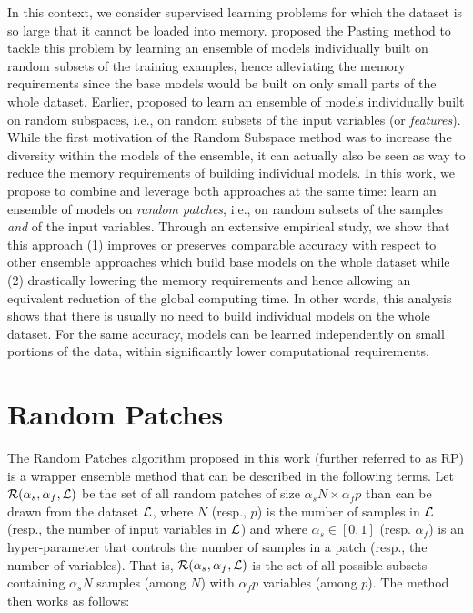 In this context, we consider supervised learning problems for which the dataset
is so large that it cannot be loaded into memory. \citet{breiman:1999} proposed
the Pasting method to tackle this problem by learning an ensemble of models
individually built on random subsets of the training examples, hence
alleviating the memory requirements since the base models would be built on
only small parts of the whole dataset. Earlier, \citet{ho:1998} proposed to
learn an ensemble of models individually built on random subspaces, i.e., on
random subsets of the input variables (or \textit{features}). While the first motivation of the Random
Subspace method was to increase the diversity within the models of the
ensemble, it can actually also be seen as way to reduce the memory requirements
of building individual models. In this work, we propose to combine and leverage
both approaches at the same time: learn an ensemble of models on \textit{random
patches}, i.e., on random subsets of the samples \textit{and} of the input
variables. Through an extensive empirical study, we show that this approach (1)
improves or preserves comparable accuracy with respect to other ensemble
approaches which build base models on the whole dataset while (2) drastically
lowering the memory requirements and hence allowing an equivalent reduction of
the global computing time. In other words, this analysis shows that there is
usually no need to build individual models on the whole dataset. For the same
accuracy, models can be learned independently on small portions of the data,
within significantly lower computational requirements.

\section{Random Patches}
\label{sec:9:rp}

The Random Patches algorithm proposed in this work (further referred to as RP)
is a wrapper ensemble method that can be described in the following terms. Let
${\cal R}(\alpha_s, \alpha_f, {\cal L})$ be the set of all random patches of
size $\alpha_s N \times \alpha_f p$ than can be drawn from the dataset ${\cal
L}$, where $N$ (resp., $p$) is the number of samples in ${\cal L}$ (resp.,  the
number of input variables in ${\cal L}$) and where $\alpha_s \in [0, 1]$\label{ntn:alpha_s} (resp.
$\alpha_f$\label{ntn:alpha_f}) is an hyper-parameter that controls the number of samples in a
patch (resp., the number of variables). That is, ${\cal R}(\alpha_s, \alpha_f,
{\cal L})$ is the set of all possible subsets containing $\alpha_s N$ samples
(among $N$) with $\alpha_f p$ variables (among $p$). The method then works as
follows:

